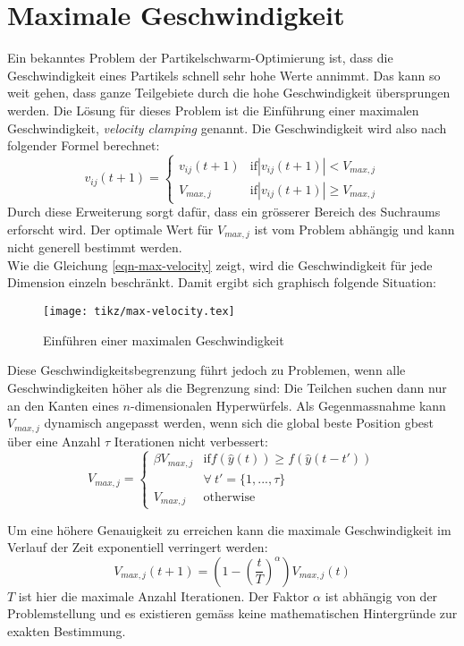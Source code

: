 \section{Maximale Geschwindigkeit}

Ein bekanntes Problem der Partikelschwarm-Optimierung ist, dass die Geschwindigkeit eines Partikels schnell sehr hohe Werte annimmt. Das kann so weit gehen, dass ganze Teilgebiete durch die hohe Geschwindigkeit übersprungen werden. Die Lösung für dieses Problem ist die Einführung einer maximalen Geschwindigkeit, \textit{velocity clamping} genannt. Die Geschwindigkeit wird also nach folgender Formel berechnet:
\begin{equation}
	v_{ij}(t+1) = 
	\begin{cases}
		v_{ij}(t+1) & \text{if} |v_{ij}(t+1)| < V_{max,j} \\
		V_{max,j} & \text{if} |v_{ij}(t+1)| \geq V_{max,j}
	\end{cases}
	\label{eqn-max-velocity}
\end{equation}
Durch diese Erweiterung sorgt dafür, dass ein grösserer Bereich des Suchraums erforscht wird. Der optimale Wert für $V_{max,j}$ ist vom Problem abhängig und kann nicht generell bestimmt werden. \\

Wie die Gleichung \ref{eqn-max-velocity} zeigt, wird die Geschwindigkeit für jede Dimension einzeln beschränkt. Damit ergibt sich graphisch folgende Situation:

\begin{figure}[htbp]
	\centering
	\texttt{[image: tikz/max-velocity.tex]}
	\caption{Einführen einer maximalen Geschwindigkeit}
	\label{fig-max-velocity}
\end{figure}

Diese Geschwindigkeitsbegrenzung führt jedoch zu Problemen, wenn alle Geschwindigkeiten höher als die Begrenzung sind: Die Teilchen suchen dann nur an den Kanten eines $n$-dimensionalen Hyperwürfels. Als Gegenmassnahme kann $V_{max,j}$ dynamisch angepasst werden, wenn sich die global beste Position gbest über eine Anzahl $\tau$ Iterationen nicht verbessert:
\begin{equation}
	V_{max,j} = 
	\begin{cases}
		\beta V_{max,j} & \text{if} f(\hat{y}(t)) \geq f(\hat{y}(t-t')) \\
			& \forall \: t' = \{ 1, ..., \tau \} \\
		V_{max,j} & \text{otherwise}
	\end{cases}
\end{equation}

Um eine höhere Genauigkeit zu erreichen kann die maximale Geschwindigkeit im Verlauf der Zeit exponentiell verringert werden:
\begin{equation}
	V_{max,j}(t+1) = \left(1-\left(\frac{t}{T}\right)^{\alpha}\right) V_{max,j}(t)
\end{equation}
$T$ ist hier die maximale Anzahl Iterationen. Der Faktor $\alpha$ ist abhängig von der Problemstellung und es existieren gemäss \cite{Han-Modification} keine mathematischen Hintergründe zur exakten Bestimmung. \\